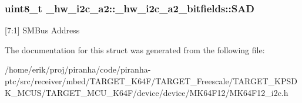 \subsubsection[{\texorpdfstring{S\+AD}{SAD}}]{\setlength{\rightskip}{0pt plus 5cm}uint8\+\_\+t \+\_\+hw\+\_\+i2c\+\_\+a2\+::\+\_\+hw\+\_\+i2c\+\_\+a2\+\_\+bitfields\+::\+S\+AD}\hypertarget{struct__hw__i2c__a2_1_1__hw__i2c__a2__bitfields_a65b2e0dc3b5bd4f8b2abcea52bdcf7c6}{}\label{struct__hw__i2c__a2_1_1__hw__i2c__a2__bitfields_a65b2e0dc3b5bd4f8b2abcea52bdcf7c6}
\mbox{[}7\+:1\mbox{]} S\+M\+Bus Address 

The documentation for this struct was generated from the following file\+:\begin{DoxyCompactItemize}
\item 
/home/erik/proj/piranha/code/piranha-\/ptc/src/receiver/mbed/\+T\+A\+R\+G\+E\+T\+\_\+\+K64\+F/\+T\+A\+R\+G\+E\+T\+\_\+\+Freescale/\+T\+A\+R\+G\+E\+T\+\_\+\+K\+P\+S\+D\+K\+\_\+\+M\+C\+U\+S/\+T\+A\+R\+G\+E\+T\+\_\+\+M\+C\+U\+\_\+\+K64\+F/device/device/\+M\+K64\+F12/M\+K64\+F12\+\_\+i2c.\+h\end{DoxyCompactItemize}
